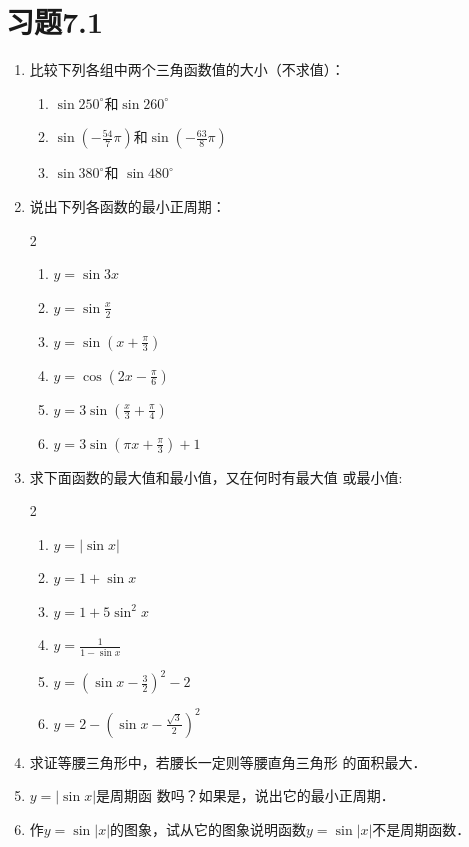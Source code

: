 \section*{习题7.1}
\begin{enumerate}
    \item 比较下列各组中两个三角函数值的大小（不求值）：
    \begin{enumerate}
        \item $\sin250^{\circ}$和$\sin260^{\circ}$
        \item $\sin\left(-\frac{54}{7}\pi\right)$和$\sin\left(-\frac{63}{8}\pi\right)$
        \item $\sin380^{\circ}$和 $\sin480^{\circ}$
    \end{enumerate}
    
    \item 说出下列各函数的最小正周期：
\begin{multicols}{2}
    \begin{enumerate}
        \item $y=\sin 3x$
        \item $y=\sin\frac{x}{2}$
        \item $y=\sin \left(x+\frac{\pi}{3}\right)$
        \item $y=\cos \left(2 x-\frac{\pi}{6}\right)$
        \item $y=3 \sin \left(\frac{x}{3}+\frac{\pi}{4}\right)$
        \item $y=3 \sin \left(\pi x+\frac{\pi}{3}\right)+1$
    \end{enumerate}
\end{multicols}

\item 求下面函数的最大值和最小值，又在何时有最大值
或最小值:
\begin{multicols}{2}
    \begin{enumerate}
\item $y=|\sin x|$
\item $y=1+\sin x$
\item $y=1+5 \sin ^{2} x$
\item $y=\frac{1}{1-\sin x}$
\item $y=\left(\sin x-\frac{3}{2}\right)^{2}-2 $
\item $y=2-\left(\sin x-\frac{\sqrt{3}}{2}\right)^{2}$
    \end{enumerate}
\end{multicols}

\item 求证等腰三角形中，若腰长一定则等腰直角三角形
的面积最大．
\item $y=|\sin x|$是周期函
数吗？如果是，说出它的最小正周期．
\item 作$y=\sin|x|$的图象，试从它的图象说明函数$y=\sin|x|$不是周期函数．


\end{enumerate}
